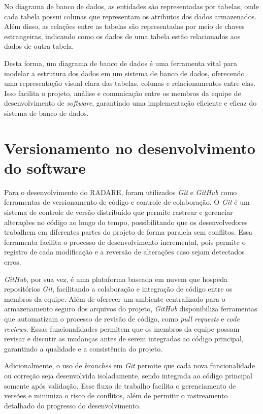 No diagrama de banco de dados, as entidades são representadas por tabelas, onde cada tabela possui colunas que representam os atributos dos dados armazenados. Além disso, as relações entre as tabelas são representadas por meio de chaves estrangeiras, indicando como os dados de uma tabela estão relacionados aos dados de outra tabela.
            
Desta forma, um diagrama de banco de dados é uma ferramenta vital para modelar a estrutura dos dados em um sistema de banco de dados, oferecendo uma representação visual clara das tabelas, colunas e relacionamentos entre elas. Isso facilita o projeto, análise e comunicação entre os membros da equipe de desenvolvimento de \textit{software}, garantindo uma implementação eficiente e eficaz do sistema de banco de dados.

\section{Versionamento no desenvolvimento do software}

Para o desenvolvimento do RADARE, foram utilizados \textit{Git} e \textit{GitHub} como ferramentas de versionamento de código e controle de colaboração. O \textit{Git} é um sistema de controle de versão distribuído que permite rastrear e gerenciar alterações no código ao longo do tempo, possibilitando que os desenvolvedores trabalhem em diferentes partes do projeto de forma paralela sem conflitos. Essa ferramenta facilita o processo de desenvolvimento incremental, pois permite o registro de cada modificação e a reversão de alterações caso sejam detectados erros.

\textit{GitHub}, por sua vez, é uma plataforma baseada em nuvem que hospeda repositórios \textit{Git}, facilitando a colaboração e integração de código entre os membros da equipe. Além de oferecer um ambiente centralizado para o armazenamento seguro dos arquivos do projeto, \textit{GitHub} disponibiliza ferramentas que automatizam o processo de revisão de código, como \textit{pull requests} e \textit{code reviews}. Essas funcionalidades permitem que os membros da equipe possam revisar e discutir as mudanças antes de serem integradas ao código principal, garantindo a qualidade e a consistência do projeto.

Adicionalmente, o uso de \textit{branches} em \textit{Git} permite que cada nova funcionalidade ou correção seja desenvolvida isoladamente, sendo integrada ao código principal somente após validação. Esse fluxo de trabalho facilita o gerenciamento de versões e minimiza o risco de conflitos, além de permitir o rastreamento detalhado do progresso do desenvolvimento.

